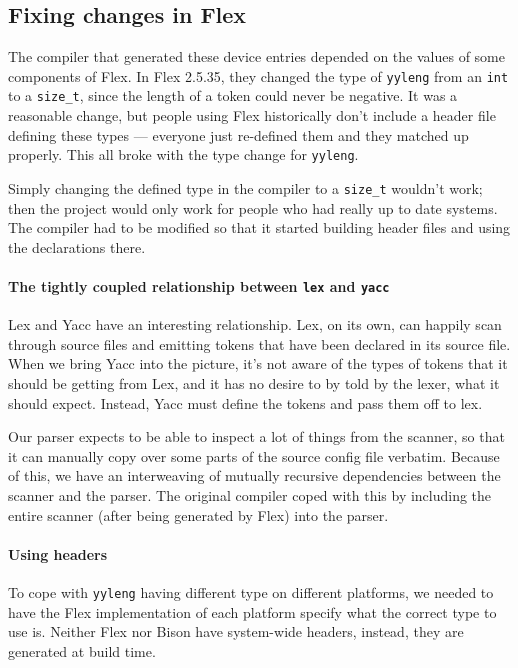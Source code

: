 \documentclass[12pt]{article}
\newcommand{\code}[1]{{\tt #1}}
\begin{document}
\subsection{Fixing changes in Flex}

The compiler that generated these device entries depended on the values of some
components of Flex. In Flex 2.5.35, they changed the type of \code{yyleng} from
an \code{int} to a \code{size\_t}, since the length of a token could never be
negative. It was a reasonable change, but people using Flex historically don't
include a header file defining these types \---- everyone just re-defined them
and they matched up properly. This all broke with the type change for
\code{yyleng}.

Simply changing the defined type in the compiler to a \code{size\_t} wouldn't
work; then the project would only work for people who had really up to date
systems. The compiler had to be modified so that it started building header
files and using the declarations there.

\paragraph{The tightly coupled relationship between \code{lex} and \code{yacc}}
Lex and Yacc have an interesting relationship. Lex, on its own, can happily scan
through source files and emitting tokens that have been declared in its source
file. When we bring Yacc into the picture, it's not aware of the types of
tokens that it should be getting from Lex, and it has no desire to by told by
the lexer, what it should expect. Instead, Yacc must define the tokens and pass
them off to lex.

Our parser expects to be able to inspect a lot of things from the scanner, so
that it can manually copy over some parts of the source config file verbatim.
Because of this, we have an interweaving of mutually recursive dependencies
between the scanner and the parser. The original compiler coped with this by
including the entire scanner (after being generated by Flex) into the parser.

\paragraph{Using headers}
To cope with \code{yyleng} having different type on different platforms, we
needed to have the Flex implementation of each platform specify what the
correct type to use is. Neither Flex nor Bison have system-wide headers,
instead, they are generated at build time.
\end{document}
